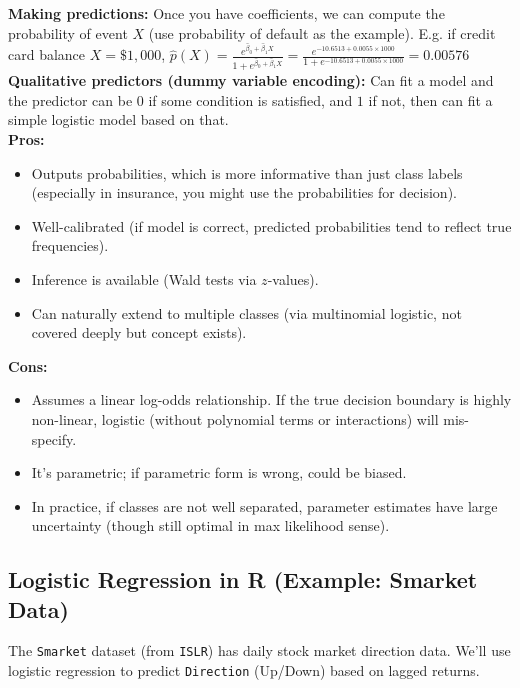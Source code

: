 \documentclass[11pt]{article}
\begin{document}
\noindent \textbf{Making predictions:} Once you have coefficients, we can compute the probability of event $X$ (use probability of default as the example). E.g. if credit card balance $X = \$1,000$, $\hat{p}(X) = \frac{e^{\hat{\beta}_{0} + \hat{\beta}_{1}X}}{1 + e^{\hat{\beta}_{0} + \hat{\beta}_{1}X}} = \frac{e^{-10.6513 + 0.0055 \times 1000}}{1 + e^{-10.6513 + 0.0055 \times 1000}} = 0.00576$ \\

\noindent \textbf{Qualitative predictors (dummy variable encoding):} Can fit a model and the predictor can be $0$ if some condition is satisfied, and $1$ if not, then can fit a simple logistic model based on that. \\

\noindent \textbf{Pros:}
\begin{itemize}
    \item  Outputs probabilities, which is more informative than just class labels (especially in insurance, you might use the probabilities for decision).
    \item Well-calibrated (if model is correct, predicted probabilities tend to reflect true frequencies).
    \item Inference is available (Wald tests via $z$-values).
    \item Can naturally extend to multiple classes (via multinomial logistic, not covered deeply but concept exists).
\end{itemize}


\noindent \textbf{Cons:}
\begin{itemize}
    \item Assumes a linear log-odds relationship. If the true decision boundary is highly non-linear, logistic (without polynomial terms or interactions) will mis-specify.
    \item It’s parametric; if parametric form is wrong, could be biased.
    \item In practice, if classes are not well separated, parameter estimates have large uncertainty (though still optimal in max likelihood sense).
\end{itemize}

\subsection{Logistic Regression in R (Example: Smarket Data)}
The \texttt{Smarket} dataset (from \texttt{ISLR}) has daily stock market direction data. We'll use logistic regression to predict \texttt{Direction} (Up/Down) based on lagged returns.
\end{document}
